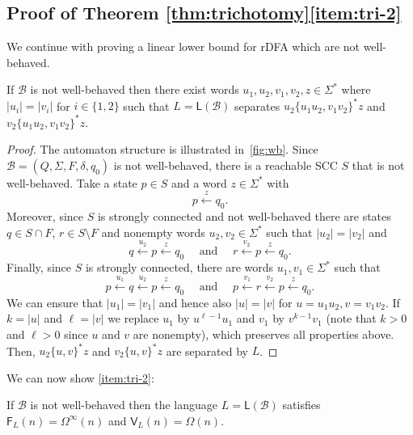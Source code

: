\documentclass{theoretics}
\newcommand{\B}{\mathcal{B}}
\newcommand{\F}{\mathsf{F}}
\renewcommand{\L}{\mathsf{L}}
\newcommand{\V}{\mathsf{V}}
\newcommand{\Omegainf}{\Omega^{\scriptscriptstyle{\infty}}}
\begin{document}
\subsection{Proof of Theorem \ref{thm:trichotomy}\ref{item:tri-2}}
We continue with proving a linear lower bound for rDFA which are not well-behaved.

\begin{lemma}
	\label{lem:linear-lb}
	If $\B$ is not well-behaved then there exist words $u_1, u_2, v_1, v_2, z \in \Sigma^*$
	where $|u_i| = |v_i|$ for $i \in \{1,2\}$
	such that $L = \L(\B)$ separates $u_2\{u_1u_2,v_1v_2\}^*z$ and $v_2\{u_1u_2,v_1v_2\}^*z$.
\end{lemma}

\begin{proof}
	The automaton structure is illustrated in~\cref{fig:wb}.
	Since $\B = (Q,\Sigma,F,\delta,q_0)$ is not well-behaved, 
	there is a reachable SCC $S$ that is not well-behaved. 
	Take a state $p \in S$ and a word $z \in \Sigma^*$ with 
	\[
	p \xleftarrow{z} q_0 .
	\]
	Moreover, since $S$ is strongly connected and not well-behaved
	there are states $q \in S \cap F$, $r \in S \setminus F$
	and nonempty words $u_2, v_2 \in \Sigma^*$ such that $|u_2| = |v_2|$ and
	\[
	 q \xleftarrow{u_2} p \xleftarrow{z} q_0 \quad\text{ and }\quad  r \xleftarrow{v_2} p \xleftarrow{z} q_0 .
	\]
	Finally, since  $S$ is strongly connected, there are words $u_1, v_1 \in \Sigma^*$ such that
	\[
		p \xleftarrow{u_1} q \xleftarrow{u_2} p \xleftarrow{z} q_0 \quad\text{ and }\quad p \xleftarrow{v_1} r \xleftarrow{v_2} p \xleftarrow{z} q_0 .
	\]
	We can ensure that $|u_1| = |v_1|$ and hence also $|u| = |v|$ for $u = u_1 u_2, v = v_1 v_2$.
	If $k = |u|$ and $\ell = |v|$ we replace $u_1$ by $u^{\ell-1} u_1$
	and $v_1$ by $v^{k-1} v_1$ (note that $k > 0$ and $\ell > 0$ since 
	$u$ and $v$ are nonempty), which preserves all properties above.
	Then, $u_2\{u,v\}^*z$ and $v_2\{u,v\}^*z$ are separated by $L$.
\end{proof}
We can now show \ref{item:tri-2}:
\begin{proposition}
	\label{prop:linear-lb}
	If $\B$ is not well-behaved then the language $L = \L(\B)$
	satisfies $\F_L(n) = \Omegainf(n)$ and $\V_L(n) = \Omega(n)$.
\end{proposition}
	
\end{document}
